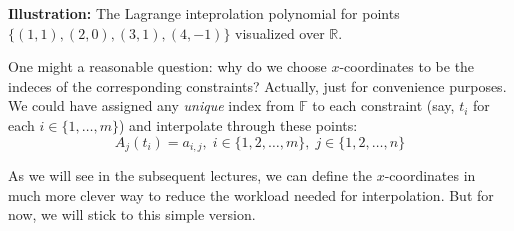\documentclass[../lecture-notes.tex]{subfiles}
\begin{document}
\begin{example}
    \begin{center}

        \scriptsize\textbf{Illustration:} The Lagrange inteprolation polynomial for points $\{(1,1), (2,0), (3,1), (4,-1)\}$ visualized over $\mathbb{R}$.
    \end{center}
\end{example}

\begin{remark}
    One might a reasonable question: why do we choose $x$-coordinates to be the indeces of the corresponding constraints? 
    Actually, just for convenience purposes. We could have assigned any \textit{unique} index from $\mathbb{F}$ to each 
    constraint (say, $t_i$ for each $i \in \{1,\dots,m\}$) and interpolate through these points:
    \begin{equation*}
        A_j(t_i) = a_{i,j}, \; i \in \{1,2,\dots,m\}, \; j \in \{1,2,\dots,n\}
    \end{equation*}

    As we will see in the subsequent lectures, we can define the $x$-coordinates in much more clever way to reduce the workload
    needed for interpolation. But for now, we will stick to this simple version.
\end{remark}
\end{document}
